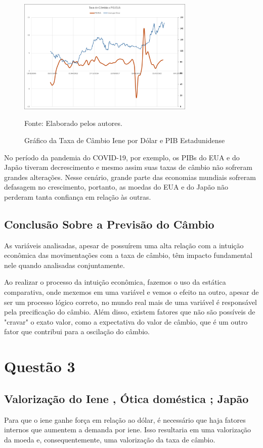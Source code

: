\documentclass[a4paper,12pt]{article}[abntex2]
\begin{document}
\begin{figure}[H]
    \centering
    \caption{Gráfico da Taxa de Câmbio Iene por Dólar e PIB Estadunidense} 
    \includegraphics[width=0.75\textwidth]{PIB EUA.png}
    \label{fig:cambioPIBEUA}
    
    \footnotesize{Fonte: Elaborado pelos autores.}
    \end{figure}

No período da pandemia do COVID-19, por exemplo, os PIBs do EUA e do Japão tiveram decrescimento e mesmo assim suas taxas de câmbio não sofreram grandes alterações. Nesse cenário, grande parte das economias mundiais sofreram defasagem no crescimento, portanto, as moedas do EUA e do Japão não perderam tanta confiança em relação às outras.  

\subsection{\textbf{Conclusão Sobre a Previsão do Câmbio}}
As variáveis analisadas, apesar de possuírem uma alta relação com a intuição econômica das movimentações com a taxa de câmbio, têm impacto fundamental nele quando analisadas conjuntamente.

Ao realizar o processo da intuição econômica, fazemos o uso da estática comparativa, onde mexemos em uma variável e vemos o efeito na outro, apesar de ser um processo lógico correto, no mundo real mais de uma variável é responsável pela precificação do câmbio. Além disso, existem fatores que não são possíveis de "cravar" o exato valor, como a expectativa do valor de câmbio, que é um outro fator que contribui para a oscilação do câmbio.

\section{\textbf{Questão 3}}
\subsection{\textbf{Valorização do Iene , Ótica doméstica ; Japão}}
Para que o iene ganhe força em relação ao dólar, é necessário que haja fatores internos que aumentem a demanda por iene. Isso resultaria em uma valorização da moeda e, consequentemente, uma valorização da taxa de câmbio.
\end{document}
